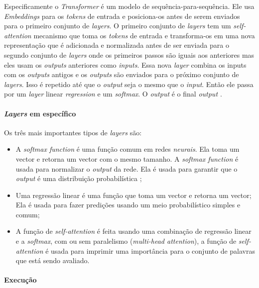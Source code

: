 Especificamente o \textit{Transformer} é um modelo de sequência-para-sequência. Ele usa \textit{Embeddings} para os \textit{tokens} de entrada e posiciona-os antes de serem enviados para o primeiro conjunto de \textit{layers}. O primeiro conjunto de \textit{layers} tem um \textit{self-attention} \cite{mtf2} mecanismo que toma os \textit{tokens} \cite{mtf1} de entrada e transforma-os em uma nova representação que é adicionada e normalizada antes de ser enviada para o segundo conjunto de \textit{layers} onde os primeiros passos são iguais aos anteriores mas eles usam os \textit{outputs} anteriores como \textit{inputs}. Essa nova \textit{layer} combina os inputs com os \textit{outputs} antigos e os \textit{outputs} são enviados para o próximo conjunto de \textit{layers}. Isso é repetido até que o \textit{output} seja o mesmo que o \textit{input}. Então ele passa por um \textit{layer} linear \textit{regression} e um \textit{softmax}. O \textit{output} é o final \textit{output \cite{hf1}}.

\paragraph{\textit{Layers} em específico\\}

Os três mais importantes tipos de \textit{layers} \cite{hf1} são:
\begin{itemize}
  \setlength\itemsep{0.05em}
    \item A \textit{softmax function} é uma função comum em redes \textit{neurais}. Ela toma um vector e retorna um vector com o mesmo tamanho. A \textit{softmax function} é usada para normalizar o \textit{output} da rede. Ela é usada para garantir que o \textit{output} é uma distribuição probabilística \cite{mtf1};
    \item Uma regressão linear é uma função que toma um vector e retorna um vector; Ela é usada para fazer predições usando um meio probabilístico simples e comum;
    \item A função de \textit{self-attention} é feita usando uma combinação de regressão linear e a \textit{softmax}, com ou sem paralelismo (\textit{multi-head attention}), a função de \textit{self-attention} é usada para imprimir uma importância para o conjunto de palavras que está sendo avaliado.
\end{itemize}

\paragraph{Execução\\}

